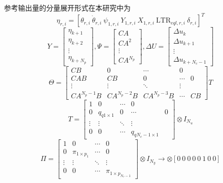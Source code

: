             参考输出量的分量展开形式在本研究中为
            \begin{equation}
            \eta_{r,i} = [\theta_{r,i}\ \dot{\theta}_{r,i}\ \psi_{1,r,i}\ Y_{1,r,i}\ X_{1,r,i}\ \mathrm{LTR}_{eql,r,i}\ \delta_{r,i}]^T
            \end{equation}
            \begin{equation}
            Y = \begin{bmatrix} \eta_{k+1} \\ \eta_{k+2} \\ \vdots \\ \eta_{k+N_p} \end{bmatrix}, \Psi = \begin{bmatrix} C A \\ C A^2 \\ \vdots \\ C A^{N_p} \end{bmatrix}, \Delta U = \begin{bmatrix} \Delta u_k \\ \Delta u_{k+1} \\ \vdots \\ \Delta u_{k+N_c - 1} \end{bmatrix}
            \end{equation}
            \begin{equation}
            \Theta = \begin{bmatrix}
            C B & 0 & \cdots & 0 \\
            C A B & C B & 0 & \cdots & 0 \\
            \vdots & \vdots & \ddots & \vdots \\
            C A^{N_p - 1} B & C A^{N_p - 2} B & C A^{N_p - 3} B & \cdots & C B
            \end{bmatrix} T
            \end{equation}
            \begin{equation}
            T = \begin{bmatrix}
            1 & 0 & \cdots & 0 \\
            0 & q_{q1 \times 1} & 0 & \cdots & 0 \\
            \vdots & \vdots & \ddots & \vdots \\
            0 & 0 & \cdots & q_{qN_c - 1 \times 1}
            \end{bmatrix} \otimes I_{N_u}
            \end{equation}
            \begin{equation}
            \Pi = \begin{bmatrix}
            1 & 0 & \cdots & 0 \\
            0 & \pi_{1 \times p_1} & \cdots & 0 \\
            \vdots & \vdots & \ddots & \vdots \\
            0 & 0 & \cdots & \pi_{1 \times p_{N_r - 1}}
            \end{bmatrix} \otimes I_{N_y} \rightarrow \otimes [0\ 0\ 0\ 0\ 0\ 1\ 0\ 0]
            \end{equation}
